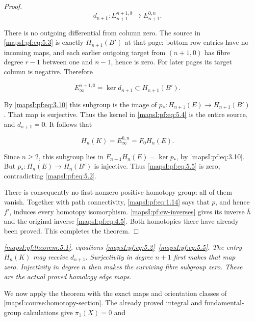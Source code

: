 \documentclass[11pt]{article}
\begin{document}
\begin{proof}
\begin{equation}
d_{n+1}:E_{n+1}^{n+1,0}\longrightarrow E_{n+1}^{0,n}.
\label{mapsI:pf:eq:5.3}
\end{equation}

There is no outgoing differential from column zero. The source in \eqref{mapsI:pf:eq:5.3} is exactly \(H_{n+1}(B')\) at that page: bottom-row entries have no incoming maps, and each earlier outgoing target from \((n+1,0)\) has fibre degree \(r-1\) between one and \(n-1\), hence is zero. For later pages its target column is negative. Therefore

\begin{equation}
E_\infty^{n+1,0}=\ker d_{n+1}\subset H_{n+1}(B').
\label{mapsI:pf:eq:5.4}
\end{equation}

By \eqref{mapsI:pf:eq:3.10} this subgroup is the image of \(p_*:H_{n+1}(E)\to H_{n+1}(B')\). That map is surjective. Thus the kernel in \eqref{mapsI:pf:eq:5.4} is the entire source, and \(d_{n+1}=0\). It follows that

\begin{equation}
H_n(K)=E_\infty^{0,n}=F_0H_n(E).
\label{mapsI:pf:eq:5.5}
\end{equation}

Since \(n\geq2\), this subgroup lies in \(F_{n-1}H_n(E)=\ker p_*\), by \eqref{mapsI:pf:eq:3.10}. But \(p_*:H_n(E)\to H_n(B')\) is injective. Thus \eqref{mapsI:pf:eq:5.5} is zero, contradicting \eqref{mapsI:pf:eq:5.2}.

There is consequently no first nonzero positive homotopy group: all of them vanish. Together with path connectivity, \eqref{mapsI:pf:eq:1.14} says that \(p\), and hence \(f'\), induces every homotopy isomorphism. \cref{mapsI:pf:cw-inverses} gives its inverse \(\bar h\) and the original inverse \eqref{mapsI:pf:eq:4.5}. Both homotopies there have already been proved. This completes the theorem.
\end{proof}

\emph{\cref{mapsI:pf:theorem:5.1}, equations \eqref{mapsI:pf:eq:5.2}--\eqref{mapsI:pf:eq:5.5}. The entry \(H_n(K)\) may receive \(d_{n+1}\). Surjectivity in degree \(n+1\) first makes that map zero. Injectivity in degree \(n\) then makes the surviving fibre subgroup zero. These are the actual proved homology edge maps.}

We now apply the theorem with the exact maps and orientation classes of \cref{mapsI:course:homotopy-section}. The already proved integral and fundamental-group calculations give \(\pi_1(X)=0\) and
\end{document}
